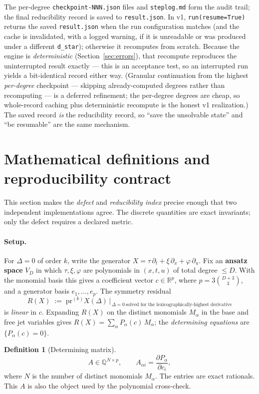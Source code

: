 \documentclass[11pt]{article}
\theoremstyle{definition}
\newtheorem{definition}{Definition}[section]
\theoremstyle{remark}
\newcommand{\R}{\mathbb{R}}
\newcommand{\Q}{\mathbb{Q}}
\newcommand{\X}{X}
\begin{document}
The per-degree \texttt{checkpoint-NNN.json} files and \texttt{steplog.md} form the audit trail; the
final reducibility record is saved to \texttt{result.json}. In v1, \texttt{run(resume=True)} returns
the saved \texttt{result.json} when the run configuration matches (and the cache is invalidated, with a
logged warning, if it is unreadable or was produced under a different \texttt{d\_star}); otherwise it
recomputes from scratch. Because the engine is \emph{deterministic} (Section~\ref{sec:errors}), that
recompute reproduces the uninterrupted result exactly --- this is an acceptance test, so an interrupted
run yields a bit-identical record either way. (Granular continuation from the highest \emph{per-degree}
checkpoint --- skipping already-computed degrees rather than recomputing --- is a deferred refinement;
the per-degree degrees are cheap, so whole-record caching plus deterministic recompute is the honest v1
realization.) The saved record \emph{is} the reducibility record, so ``save the unsolvable state'' and
``be resumable'' are the same mechanism.

\section{Mathematical definitions and reproducibility contract}
\label{sec:defs}

This section makes the \emph{defect} and \emph{reducibility index} precise enough that two
independent implementations agree. The discrete quantities are exact invariants; only the defect
requires a declared metric.

\paragraph{Setup.} For $\Delta=0$ of order $k$, write the generator
$\X=\tau\,\partial_t+\xi\,\partial_x+\varphi\,\partial_u$. Fix an \textbf{ansatz space} $V_D$ in
which $\tau,\xi,\varphi$ are polynomials in $(x,t,u)$ of total degree $\le D$. With the monomial
basis this gives a coefficient vector $c\in\R^{p}$, where $p=3\binom{D+3}{3}$, and a generator basis
$e_1,\dots,e_p$. The symmetry residual
\[
R(\X)\;:=\;\mathrm{pr}^{(k)}\X(\Delta)\,\big|_{\,\Delta=0\ \text{solved for the
lexicographically-highest derivative}}
\]
is \emph{linear} in $c$. Expanding $R(\X)$ on the distinct monomials $M_\alpha$ in the base and free
jet variables gives $R(\X)=\sum_\alpha P_\alpha(c)\,M_\alpha$; the \emph{determining equations} are
$\{P_\alpha(c)=0\}$.

\begin{definition}[Determining matrix]
\[
A\in\Q^{N\times p},\qquad A_{\alpha i}=\frac{\partial P_\alpha}{\partial c_i},
\]
where $N$ is the number of distinct monomials $M_\alpha$. The entries are exact rationals. This $A$
is also the object used by the polynomial cross-check.
\end{definition}
\end{document}
